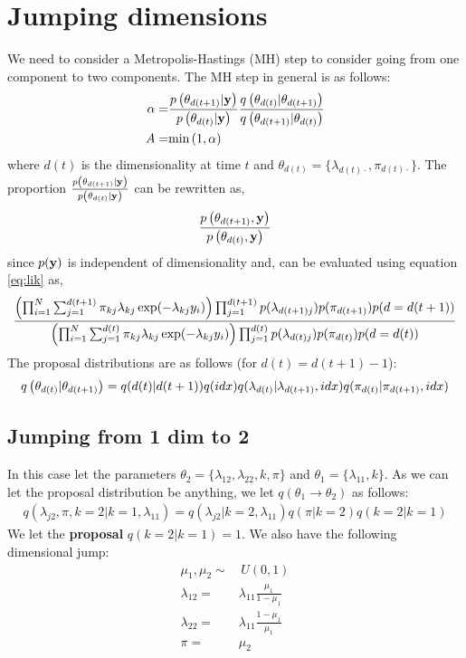\documentclass{article}
\begin{document}
\section{Jumping dimensions}
We need to consider a Metropolis-Hastings (MH) step to consider going from one component to two components. The MH step in general is as follows:
\begin{align}
\alpha = & \frac{p\left(\theta_{d(t+1)}|\mathbf{y}\right)}{p\left(\theta_{d(t)}|\mathbf{y}\right)}\frac{q\left(\theta_{d(t)}|\theta_{d(t+1)}\right)}{q\left(\theta_{d(t+1)}|\theta_{d(t)}\right)}\\
A = & \text{min}\left(1,\alpha\right)
\end{align}
where $d(t)$ is the dimensionality at time $t$ and $\theta_{d(t)}=\{\lambda_{d(t)\cdot},\pi_{d(t)\cdot}\}$. The proportion $\frac{p\left(\theta_{d(t+1)}|\mathbf{y}\right)}{p\left(\theta_{d(t)}|\mathbf{y}\right)}$ can be rewritten as,
\begin{align}
\frac{p\left(\theta_{d(t+1)},\mathbf{y}\right)}{p\left(\theta_{d(t)},\mathbf{y}\right)}
\end{align}
since $p(\mathbf{y})$ is independent of dimensionality and, can be evaluated using equation \ref{eq:lik} as,
\begin{align}
\frac{\left(\prod_{i=1}^{N}\sum_{j=1}^{d(t+1)}\pi_{kj}\lambda_{kj}\exp(-\lambda_{kj}y_i)\right)\prod_{j=1}^{d(t+1)}p(\lambda_{d(t+1)j})p(\pi_{d(t+1)})p(d=d(t+1))}{\left(\prod_{i=1}^{N}\sum_{j=1}^{d(t)}\pi_{kj}\lambda_{kj}\exp(-\lambda_{kj}y_i)\right)\prod_{j=1}^{d(t)}p(\lambda_{d(t)j})p(\pi_{d(t)})p(d=d(t))}
\end{align}
The proposal distributions are as follows (for $d(t)=d(t+1)-1$):
\begin{align}
q\left(\theta_{d(t)}|\theta_{d(t+1)}\right)=q(d(t)|d(t+1))q(idx)q(\lambda_{d(t)}|\lambda_{d(t+1)},idx)q(\pi_{d(t)}|\pi_{d(t+1)},idx)
\end{align}

\subsection{Jumping from 1 dim to 2}
In this case let the parameters $\theta_2=\{\lambda_{12},\lambda_{22},k,\pi\}$ and $\theta_1=\{\lambda_{11},k\}$. As we can let the proposal distribution be anything, we let $q(\theta_1\to\theta_2)$ as follows:
\begin{align}
q(\lambda_{j2},\pi,k=2|k=1,\lambda_{11})=q(\lambda_{j2}|k=2,\lambda_{11})q(\pi|k=2)q(k=2|k=1)
\end{align}
We let the \textbf{proposal} $q(k=2\vert k=1)=1$. We also have the following dimensional jump:
\begin{align}
\mu_1,\mu_2\sim & \,U(0,1)\\
\lambda_{12}=&\lambda_{11}\frac{\mu_1}{1-\mu_1}
\label{eq:lambda_12}\\
\lambda_{22}=&\lambda_{11}\frac{1-\mu_1}{\mu_1}
\label{eq:lambda_22}\\
\pi=&\mu_2
\end{align} 
\end{document}
